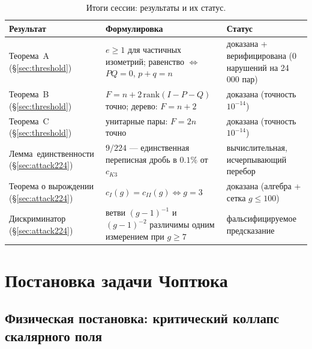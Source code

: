 \documentclass[11pt,a4paper]{article}
\theoremstyle{definition}
\theoremstyle{remark}
\begin{document}
\begin{table}[htbp]
\centering
\small
\caption{Итоги сессии: результаты и их статус.}
\label{tab:summary}
\begin{tabularx}{\textwidth}{@{}lYY@{}}
\toprule
Результат & Формулировка & Статус \\
\midrule
Теорема~A (\S\ref{sec:threshold}) & $e \ge 1$ для частичных изометрий;
равенство $\Leftrightarrow$ $PQ = 0$, $p + q = n$ & доказана + верифицирована
(0 нарушений на 24\,000 пар) \\
Теорема~B (\S\ref{sec:threshold}) & $F = n + 2\,\mathrm{rank}(I{-}P{-}Q)$
точно; дерево: $F = n + 2$ & доказана (точность $10^{-14}$) \\
Теорема~C (\S\ref{sec:threshold}) & унитарные пары: $F = 2n$ точно &
доказана (точность $10^{-14}$) \\
Лемма~единственности (\S\ref{sec:attack224}) & $9/224$ --- единственная
переписная дробь в $0.1\%$ от $c_{K3}$ & вычислительная, исчерпывающий перебор \\
Теорема о вырождении (\S\ref{sec:attack224}) & $c_I(g) = c_{II}(g)
\Leftrightarrow g = 3$ & доказана (алгебра + сетка $g \le 100$) \\
Дискриминатор (\S\ref{sec:attack224}) & ветви $(g{-}1)^{-1}$ и $(g{-}1)^{-2}$
различимы одним измерением при $g \ge 7$ & фальсифицируемое предсказание \\
\bottomrule
\end{tabularx}
\end{table}

\section{Постановка задачи Чоптюка}\label{sec:statement}

\subsection{Физическая постановка: критический коллапс скалярного поля}
\end{document}
